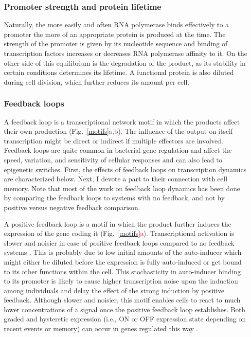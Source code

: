 \subsubsection{Promoter strength and protein lifetime}
Naturally, the more easily and often RNA polymerase binds effectively to a promoter the more of an appropriate protein is produced at the time.
The strength of the promoter is given by its nucleotide sequence and binding of transcription factors increases or decreases RNA polymerase affinity to it.
On the other side of this equilibrium is the degradation of the product, as its stability in certain conditions determines its lifetime.
A functional protein is also diluted during cell division, which further reduces its amount per cell.

\subsubsection{Feedback loops}
A feedback loop is a transcriptional network motif in which the products affect their own production (Fig.~\ref{motifs}\textcolor{red}{a},\textcolor{red}{b}).
The influence of the output on itself transcription might be direct or indirect if multiple effectors are involved.
Feedback loops are quite common in bacterial gene regulation and affect the speed, variation, and sensitivity of cellular responses and can also lead to epigenetic switches.
First, the effects of feedback loops on transcription dynamics are characterized below.
Next, I devote a part to their connection with cell memory.
Note that most of the work on feedback loop dynamics has been done by comparing the feedback loops to systems with no feedback, and not by positive versus negative feedback comparison.

A positive feedback loop is a motif in which the product further induces the expression of the gene coding it (Fig.~\ref{motifs}\textcolor{red}{a}).
Transcriptional activation is slower and noisier in case of positive feedback loops compared to no feedback systems \cite{maeda2006regulatory, sayut2007noise}.
This is probably due to low initial amounts of the auto-inducer which might either be diluted before the expression is fully auto-induced or get bound to its other functions within the cell.
This stochasticity in auto-inducer binding to its promoter is likely to cause higher transcription noise upon the induction among individuals and delay the effect of the strong induction by positive feedback.
Although slower and noisier, this motif enables cells to react to much lower concentrations of a signal once the positive feedback loop establishes.
Both graded and hysteretic expression (i.e., ON or OFF expression state depending on recent events or memory) can occur in genes regulated this way \cite{maeda2006regulatory}.

